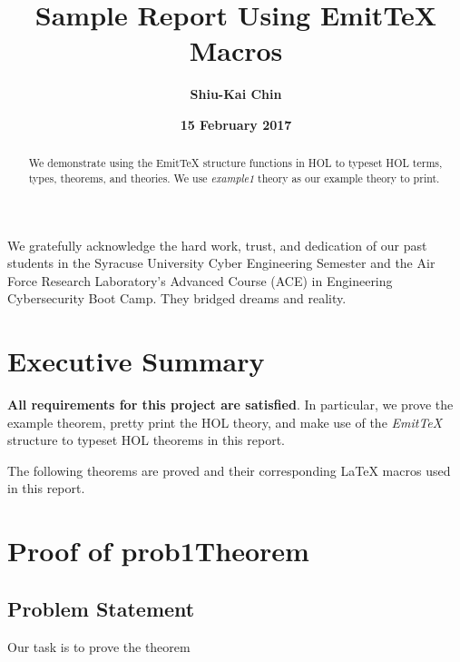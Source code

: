 \documentclass{report}
\title{Sample Report Using EmitTeX Macros}
\author{\textbf{Shiu-Kai Chin}}
\date{\textbf{15 February 2017}}
\begin{document}
\lstset{language=ML}


\maketitle{}

\begin{abstract}
  We demonstrate using the EmitTeX structure functions in HOL to
  typeset HOL terms, types, theorems, and theories. We use
  \emph{example1} theory as our example theory to print.
\end{abstract}

\begin{acknowledgments}
  We gratefully acknowledge the hard work, trust, and dedication of
  our past students in the Syracuse University Cyber Engineering
  Semester and the Air Force Research Laboratory's Advanced Course
  (ACE) in Engineering Cybersecurity Boot Camp.  They bridged dreams
  and reality.
\end{acknowledgments}

\tableofcontents{}

\chapter{Executive Summary}
\label{cha:executive-summary}

\textbf{All requirements for this project are satisfied}.  In
particular, we prove the example theorem, pretty print the HOL theory,
and make use of the \emph{EmitTeX} structure to typeset HOL theorems
in this report.

The following theorems are proved and their corresponding \LaTeX{}
macros used in this report.
\begin{quote}
  \HOLexampleOneTheorems
\end{quote}

\chapter{Proof of prob1Theorem}
\label{cha:proof-prob1theorem}

\section{Problem Statement}
\label{sec:problem-statement}
Our task is to prove the theorem \HOLexampleOneTheoremsprobOneTheorem
\end{document}
